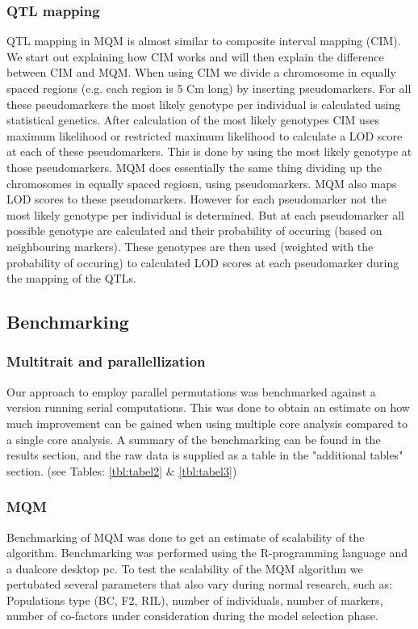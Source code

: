 \subsubsection*{QTL mapping}
QTL mapping in MQM is almost similar to composite interval mapping (CIM). We start out explaining how CIM works and will then explain the difference between CIM and MQM.
When using CIM we divide a chromosome in equally spaced regions (e.g. each region is 5 Cm long) by inserting pseudomarkers. For all these pseudomarkers the most likely genotype per individual is calculated using statistical genetics.
 After calculation of the most likely genotypes CIM uses maximum likelihood or restricted maximum likelihood to calculate a LOD score at each of these pseudomarkers. This is done by using the most 
likely genotype at those pseudomarkers. MQM does essentially the same thing dividing up the chromosomes in equally spaced regiosn, using pseudomarkers. MQM also maps LOD scores to these pseudomarkers. 
However for each pseudomarker not the most likely genotype per individual is determined. But at each pseudomarker all possible genotype are calculated and their 
probability of occuring (based on neighbouring markers). These genotypes are then used (weighted with the probability of occuring) to calculated LOD scores at each pseudomarker during the mapping of the QTLs.
\subsection{Benchmarking}
\subsubsection*{Multitrait and parallellization}
Our approach to employ parallel permutations was benchmarked against a version running serial computations. This was done to obtain an estimate 
on how much improvement can be gained when using multiple core analysis compared to a single core analysis. A summary of the benchmarking can be found in the results 
section, and the raw data is supplied as a table in the "additional tables" section. (see Tables: \ref{tbl:tabel2} \& \ref{tbl:tabel3})
\subsubsection*{MQM}
Benchmarking of MQM was done to get an estimate of scalability of the algorithm. Benchmarking was performed using the R-programming language 
and a dualcore desktop pc. To test the scalability of the MQM algorithm we pertubated several parameters that also vary during normal research, such as: Populations type (BC, F2, RIL), number of individuals, number of markers, number of co-factors under consideration during the model selection phase.

